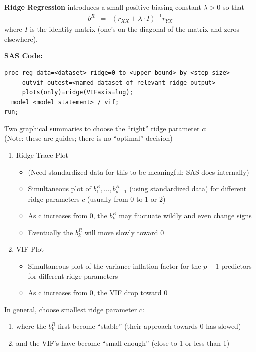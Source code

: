 \documentclass[12pt]{../notes}
\begin{document}
\nspace
\textbf{Ridge Regression} introduces a small positive biasing constant $\lambda > 0$ so that
\begin{eqnarray}
  b^R & = & ( r_{XX} + \lambda \cdot I)^{-1} r_{YX} \nonumber
\end{eqnarray}
where $I$ is the identity matrix (one's on the diagonal of the matrix and zeros elsewhere). 

\nspace
\textbf{SAS Code:}
\begin{verbatim}
proc reg data=<dataset> ridge=0 to <upper bound> by <step size> 
     outvif outest=<named dataset of relevant ridge output> 
     plots(only)=ridge(VIFaxis=log);
  model <model statement> / vif;
run;
\end{verbatim}

\nspace
Two graphical summaries to choose the ``right'' ridge parameter $c$:\\
(Note: these are guides; there is no ``optimal'' decision)
\begin{enumerate}
  \item Ridge Trace Plot
    \begin{itemize}
      \item (Need standardized data for this to be meaningful; SAS does internally)
      \item Simultaneous plot of $b^R_1, \ldots, b^R_{p-1}$ (using standardized data) for different ridge parameters $c$ (usually from 0 to 1 or 2)\\ \vspace{1em}
      \item As c increases from 0, the $b^R_k$ may fluctuate wildly and even change signs
      \item Eventually the $b^R_k$ will move slowly toward 0
    \end{itemize}
  \item VIF Plot
 \begin{itemize}
   \item Simultaneous plot of the variance inflation factor for the $p-1$ predictors for different ridge parameters
   \item As c increases from 0, the VIF drop toward 0
 \end{itemize}

\end{enumerate}

\vspace{1em}

In general, choose smallest ridge parameter $c$:
\begin{enumerate}
   \item where the $b^R_k$ first become ``stable''
   (their approach towards 0 has slowed)
   \item and the VIF's have become ``small enough''
   (close to 1 or less than 1)
\end{enumerate}
\end{document}
